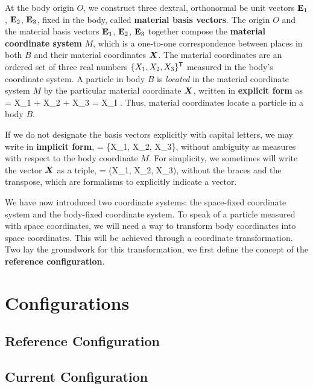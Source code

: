At the body origin $O$, we construct three dextral, orthonormal {be unit vectors} $\mathbf{E}_1$, $\mathbf{E}_2$, $\mathbf{E}_3$, fixed in the body, called {\bf material basis vectors}.
The origin $O$ and the material basis vectors $\mathbf{E}_1$, $\mathbf{E}_2$, $\mathbf{E}_3$ together compose the {\bf material coordinate system} $M$, which is a one-to-one correspondence between places in both $B$ and their material coordinates $\mbox{\boldmath $X$}$.
The material coordinates are an ordered set of three real numbers $\{X_1, X_2, X_3\}^{\mbox{\scriptsize \sffamily T}}$ measured in the body's coordinate system.  
A particle in body $B$ is {\em located} in the material coordinate system $M$ by the particular material coordinate $\mbox{\boldmath $X$}$, written in {\bf explicit form} as 
\be
\vX = X_1 \vEone + X_2 \vEtwo + X_3 \vEthree = X_I \vEsubI.
\ee
Thus, material coordinates locate a particle in a body $B$.

If we do not designate the basis vectors explicitly with capital letters,  we may write in {\bf implicit form},
\be
\vX = \{X_1, X_2, X_3\}\transpose,
\label{eq:X_no_basis}
\ee 
without ambiguity as measures with respect to the body coordinate $M$.
For simplicity, we sometimes will write the vector $\mbox{\boldmath $X$}$ as a triple, 
\be
\vX = (X_1, X_2, X_3),
\ee
without the braces and the transpose, which are formalisms to explicitly indicate a vector.

We have now introduced two coordinate systems: the space-fixed coordinate system and the body-fixed coordinate system.  To speak of a particle measured with space coordinates, we will need a way to transform body coordinates into space coordinates.  This will be achieved through a coordinate transformation.  Two lay the groundwork for this transformation, we first define the concept of the {\bf reference configuration}.

\section{Configurations}

\subsection{Reference Configuration}

\subsection{Current Configuration}


